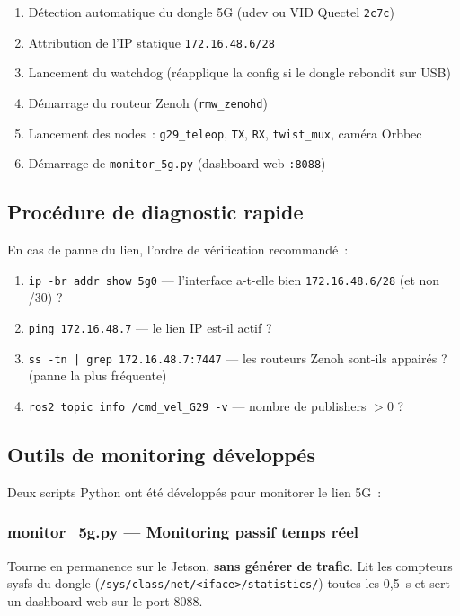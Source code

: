 \documentclass[a4paper,11pt]{article}
\begin{document}
\begin{enumerate}[noitemsep]
  \item Détection automatique du dongle 5G (udev ou VID Quectel \texttt{2c7c})
  \item Attribution de l'IP statique \texttt{172.16.48.6/28}
  \item Lancement du watchdog (réapplique la config si le dongle rebondit sur USB)
  \item Démarrage du routeur Zenoh (\texttt{rmw\_zenohd})
  \item Lancement des nodes~: \texttt{g29\_teleop}, \texttt{TX}, \texttt{RX},
        \texttt{twist\_mux}, caméra Orbbec
  \item Démarrage de \texttt{monitor\_5g.py} (dashboard web \texttt{:8088})
\end{enumerate}

\subsection{Procédure de diagnostic rapide}

En cas de panne du lien, l'ordre de vérification recommandé~:

\begin{enumerate}[noitemsep]
  \item \texttt{ip -br addr show 5g0} — l'interface a-t-elle bien
        \texttt{172.16.48.6/28} (et non /30) ?
  \item \texttt{ping 172.16.48.7} — le lien IP est-il actif ?
  \item \texttt{ss -tn | grep 172.16.48.7:7447} — les routeurs Zenoh sont-ils
        appairés ? (panne la plus fréquente)
  \item \texttt{ros2 topic info /cmd\_vel\_G29 -v} — nombre de publishers $> 0$ ?
\end{enumerate}

\subsection{Outils de monitoring développés}

Deux scripts Python ont été développés pour monitorer le lien 5G~:

\subsubsection{monitor\_5g.py — Monitoring passif temps réel}

Tourne en permanence sur le Jetson, \textbf{sans générer de trafic}. Lit les compteurs
sysfs du dongle (\texttt{/sys/class/net/<iface>/statistics/}) toutes les 0,5~s et
sert un dashboard web sur le port 8088.
\end{document}
